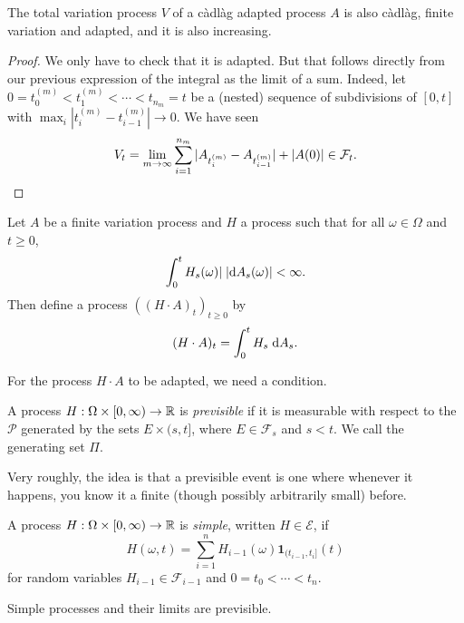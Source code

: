 \documentclass[a4paper]{article}
\begin{document}
\begin{prop}
  The total variation process $V$ of a c\`adl\`ag adapted process $A$ is also c\`adl\`ag, finite variation and adapted, and it is also increasing.
\end{prop}

\begin{proof}
  We only have to check that it is adapted. But that follows directly from our previous expression of the integral as the limit of a sum. Indeed, let $0 = t_0^{(m)} < t_1^{(m)} < \cdots < t_{n_m} = t$ be a (nested) sequence of subdivisions of $[0, t]$ with $\max_i |t_i^{(m)} - t_{i - 1}^{(m)}| \to 0$. We have seen
  \[
    V_t = \lim_{m \to \infty} \sum_{i = 1}^{n_m} |A_{t_i^{(m)}} - A_{t_{i - 1}^{(m)}}| + |A(0)| \in \mathcal{F}_t.\qedhere
  \]
\end{proof}

\begin{defi}[$(H\cdot A)_t$]
  Let $A$ be a finite variation process and $H$ a process such that for all $\omega \in \Omega$ and $t \geq 0$,
  \[
    \int_0^t H_s(\omega)|\;|\mathrm{d} A_s(\omega)| < \infty.
  \]
  Then define a process $((H \cdot A)_t)_{t \geq 0}$ by
  \[
    (H \cdot A)_t = \int_0^t H_s\;\mathrm{d} A_s.
  \]
\end{defi}
For the process $H \cdot A$ to be adapted, we need a condition.
\begin{defi}
  A process $H: \Omega \times [0, \infty) \to \mathbb{R}$ is \emph{previsible} if it is measurable with respect to the  $\mathcal{P}$ generated by the sets $E \times (s, t]$, where $E \in \mathcal{F}_s$ and $s < t$. We call the generating set $\Pi$.
\end{defi}
Very roughly, the idea is that a previsible event is one where whenever it happens, you know it a finite (though possibly arbitrarily small) before.

\begin{defi}
  A process $H: \Omega \times [0, \infty) \to \mathbb{R}$ is \emph{simple}, written $H \in \mathcal{E}$, if
  \[
    H(\omega, t) = \sum_{i = 1}^n H_{i - 1}(\omega) \mathbf{1}_{(t_{i - 1}, t_i]}(t)
  \]
  for random variables $H_{i - 1} \in \mathcal{F}_{i - 1}$ and $0 = t_0 < \cdots < t_n$.
\end{defi}

\begin{fact}
  Simple processes and their limits are previsible.
\end{fact}
\end{document}
